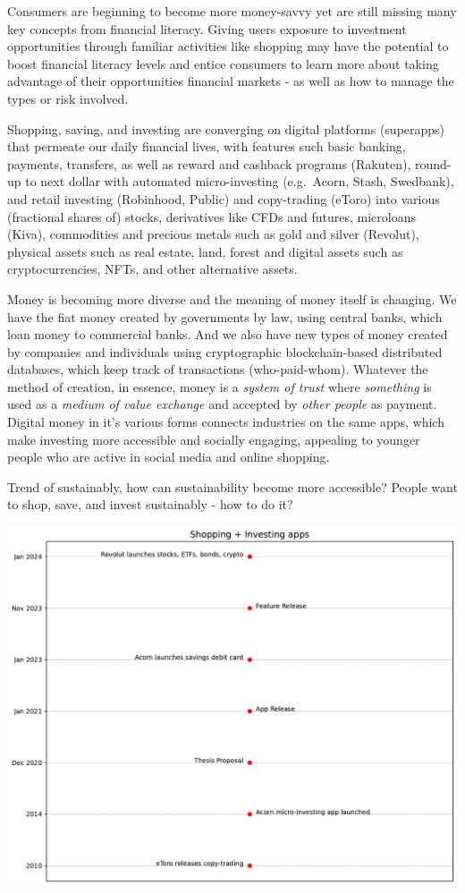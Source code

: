 \documentclass[
  letterpaper,
  DIV=11,
  numbers=noendperiod]{scrartcl}
\begin{document}
Consumers are beginning to become more money-savvy yet are still missing
many key concepts from financial literacy. Giving users exposure to
investment opportunities through familiar activities like shopping may
have the potential to boost financial literacy levels and entice
consumers to learn more about taking advantage of their opportunities
financial markets - as well as how to manage the types or risk involved.

Shopping, saving, and investing are converging on digital platforms
(superapps) that permeate our daily financial lives, with features such
basic banking, payments, transfers, as well as reward and cashback
programs (Rakuten), round-up to next dollar with automated
micro-investing (e.g.~Acorn, Stash, Swedbank), and retail investing
(Robinhood, Public) and copy-trading (eToro) into various (fractional
shares of) stocks, derivatives like CFDs and futures, microloans (Kiva),
commodities and precious metals such as gold and silver (Revolut),
physical assets such as real estate, land, forest and digital assets
such as cryptocurrencies, NFTs, and other alternative assets.

Money is becoming more diverse and the meaning of money itself is
changing. We have the fiat money created by governments by law, using
central banks, which loan money to commercial banks. And we also have
new types of money created by companies and individuals using
cryptographic blockchain-based distributed databases, which keep track
of transactions (who-paid-whom). Whatever the method of creation, in
essence, money is a \emph{system of trust} where \emph{something} is
used as a \emph{medium of value exchange} and accepted by \emph{other
people} as payment. Digital money in it's various forms connects
industries on the same apps, which make investing more accessible and
socially engaging, appealing to younger people who are active in social
media and online shopping.

Trend of sustainably, how can sustainability become more accessible?
People want to shop, save, and invest sustainably - how to do it?

\includegraphics{_thesis_files/figure-pdf/cell-35-output-1.pdf}
\end{document}
